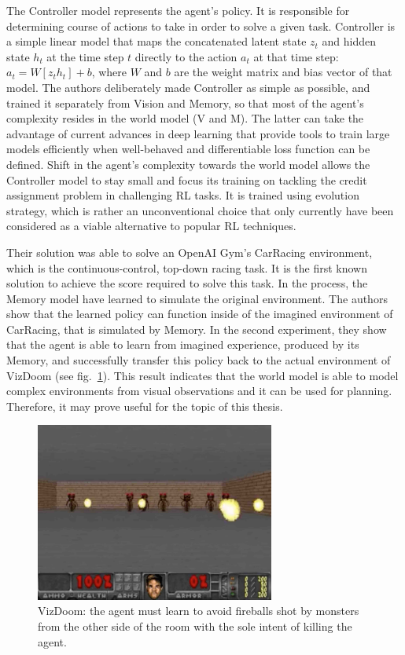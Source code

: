 The Controller model represents the agent's policy. It is responsible for determining course of actions to take in order to solve a given task. Controller is a simple linear model that maps the concatenated latent state $z_t$ and hidden state $h_t$ at the time step $t$ directly to the action $a_t$ at that time step: $a_t = W[z_t h_t] + b$, where $W$ and $b$ are the weight matrix and bias vector of that model.
The authors deliberately made Controller as simple as possible, and trained it separately from Vision and Memory, so that most of the agent's complexity resides in the world model (V and M). The latter can take the advantage of current advances in deep learning that provide tools to train large models efficiently when well-behaved and differentiable loss function can be defined.
Shift in the agent's complexity towards the world model allows the Controller model to stay small and focus its training on tackling the credit assignment problem in challenging RL tasks. It is trained using evolution strategy, which is rather an unconventional choice that only currently have been considered as a viable alternative to popular RL techniques\cite{Algo.ESRL}.

Their solution was able to solve an OpenAI Gym's CarRacing environment, which is the continuous-control, top-down racing task. It is the first known solution to achieve the score required to solve this task. In the process, the Memory model have learned to simulate the original environment. The authors show that the learned policy can function inside of the imagined environment of CarRacing, that is simulated by Memory.
In the second experiment, they show that the agent is able to learn from imagined experience, produced by its Memory, and successfully transfer this policy back to the actual environment of VizDoom (see fig.~\ref{Fig.VizDoom}). This result indicates that the world model is able to model complex environments from visual observations and it can be used for planning. Therefore, it may prove useful for the topic of this thesis. 

\begin{figure}[H]
\includegraphics[width=0.7\textwidth,keepaspectratio]{figures/VizDoom.png}
\caption[VizDoom]{VizDoom: the agent must learn to avoid fireballs shot by monsters from the other side of the room with the sole intent of killing the agent\protect\cite{Algo.WorldModels}.}
\label{Fig.VizDoom}
\end{figure}
